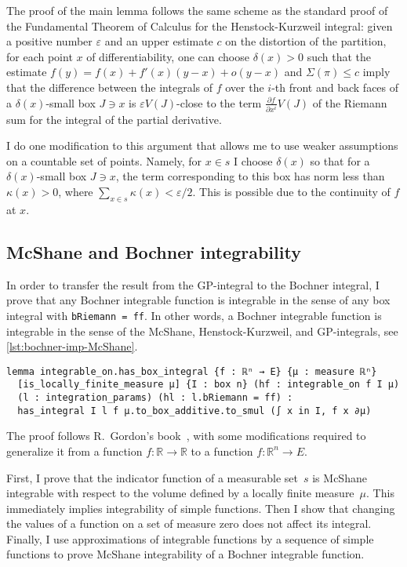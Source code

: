 \documentclass[a4paper, UKenglish,cleveref, autoref, thm-restate]{lipics-v2021}
\newcommand{\bbR}{\mathbb{R}}
\newcommand{\eps}{\varepsilon}
\begin{document}
The proof of the main lemma follows the same scheme as the standard
proof of the Fundamental Theorem of Calculus for the Henstock-Kurzweil
integral: given a positive number \(\eps\) and an upper estimate \(c\)
on the distortion of the partition, for each point \(x\) of
differentiability, one can choose \(\delta(x)>0\) such that the
estimate \(f(y)=f(x)+f'(x)(y-x)+o(y-x)\) and \(\Sigma(\pi)\le c\)
imply that the difference between the integrals of
\(f\) over the \(i\)-th front and back faces of a \(\delta(x)\)-small
box \(J\ni x\) is \(\eps V(J)\)-close to the term
\(\frac{\partial f}{\partial x^{i}}V(J)\) of the Riemann sum for the
integral of the partial derivative.

I do one modification to this argument that allows me to use weaker
assumptions on a countable set of points. Namely, for \(x\in s\) I
choose \(\delta(x)\) so that for a \(\delta(x)\)-small box \(J\ni x\),
the term corresponding to this box has norm less than \(\kappa(x)>0\),
where \(\sum_{x\in s}\kappa(x)<\eps/2\). This is possible due to the
continuity of \(f\) at \(x\).

\subsection{McShane and Bochner integrability}%
\label{sec:mcsh-bochn-integr}

In order to transfer the result from the GP-integral to the Bochner
integral, I prove that any Bochner integrable function is integrable
in the sense of any box integral with \lstinline~bRiemann = ff~. In
other words, a Bochner integrable function is integrable in the sense
of the McShane, Henstock-Kurzweil, and GP-integrals, see
\autoref{lst:bochner-imp-McShane}.

\begin{lstlisting}[caption=Bochner integrability implies box integrability,label=lst:bochner-imp-McShane]
lemma integrable_on.has_box_integral {f : ℝⁿ → E} {μ : measure ℝⁿ}
  [is_locally_finite_measure μ] {I : box n} (hf : integrable_on f I μ)
  (l : integration_params) (hl : l.bRiemann = ff) :
  has_integral I l f μ.to_box_additive.to_smul (∫ x in I, f x ∂μ)
\end{lstlisting}

The proof follows R.~Gordon's book~\cite{Gordon55}, with some
modifications required to generalize it from a function
\(f\colon\bbR\to\bbR\) to a function \(f\colon\bbR^{n}\to E\).

First, I prove that the indicator function of a measurable set~\(s\)
is McShane integrable with respect to the volume defined by a locally
finite measure~\(\mu\). This immediately implies integrability of
simple functions. Then I show that changing the values of a function
on a set of measure zero does not affect its integral. Finally, I use
approximations of integrable functions by a sequence of simple
functions to prove McShane integrability of a Bochner integrable
function.
\end{document}
